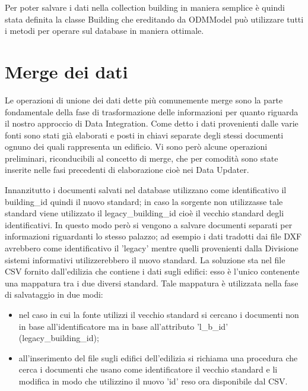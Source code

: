 \documentclass[12pt]{report}
\begin{document}
Per poter salvare i dati nella collection building in maniera semplice è quindi stata definita la classe Building che ereditando da ODMModel può utilizzare tutti i metodi per operare sul database in maniera ottimale.


\newpage
\section{Merge dei dati}

Le operazioni di unione dei dati dette più comunemente merge sono la parte fondamentale della fase di trasformazione delle informazioni per quanto riguarda il nostro approccio di Data Integration.
Come detto i dati provenienti dalle varie fonti sono stati già elaborati e posti in chiavi separate degli stessi documenti ognuno dei quali rappresenta un edificio.
Vi sono però alcune operazioni preliminari, riconducibili al concetto di merge, che per comodità sono state inserite nelle fasi precedenti di elaborazione cioè nei Data Updater.

Innanzitutto i documenti salvati nel database utilizzano come identificativo il building\_id quindi il nuovo standard; in caso la sorgente non utilizzasse tale standard viene utilizzato il legacy\_building\_id cioè il vecchio standard degli identificativi.
In questo modo però si vengono a salvare documenti separati per informazioni riguardanti lo stesso palazzo; ad esempio i dati tradotti dai file DXF avrebbero come identificativo il 'legacy' mentre quelli provenienti dalla Divisione sistemi informativi utilizzerebbero il nuovo standard. %
La soluzione sta nel file CSV fornito dall'edilizia che contiene i dati sugli edifici: esso è l'unico contenente una mappatura tra i due diversi standard.
Tale mappatura è utilizzata nella fase di salvataggio in due modi:
\begin{itemize}
\item nel caso in cui la fonte utilizzi il vecchio standard si cercano i documenti non in base all'identificatore ma in base all'attributo 'l\_b\_id' (legacy\_building\_id);
\item all'inserimento del file sugli edifici dell'edilizia si richiama una procedura che cerca i documenti che usano come identificatore il vecchio standard e li modifica in modo che utilizzino il nuovo 'id' reso ora disponibile dal CSV. 
\end{itemize} 
\vspace{5mm} %
\end{document}
